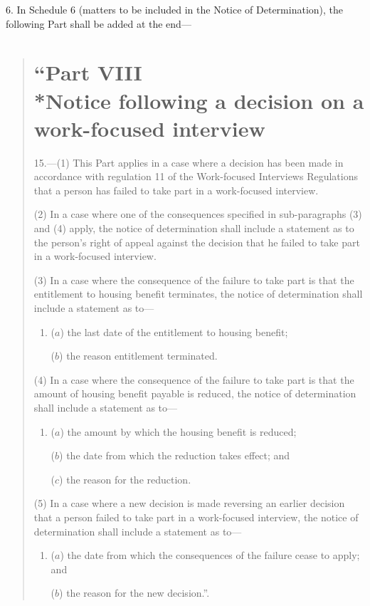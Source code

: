 \documentclass[12pt,a4paper]{article}
\begin{document}
6.  In Schedule 6 (matters to be included in the Notice of Determination), the following Part shall be added at the end—
\begin{quotation}
\section*{\sloppy “Part VIII\\*Notice following a decision on a work-focused interview}

15.---(1)  This Part applies in a case where a decision has been made in accordance with regulation 11 of the Work-focused Interviews Regulations that a person has failed to take part in a work-focused interview.

(2) In a case where one of the consequences specified in sub-paragraphs (3) and (4) apply, the notice of determination shall include a statement as to the person’s right of appeal against the decision that he failed to take part in a work-focused interview.

(3) In a case where the consequence of the failure to take part is that the entitlement to housing benefit terminates, the notice of determination shall include a statement as to—
\begin{enumerate}\item[]
($a$) the last date of the entitlement to housing benefit;

($b$) the reason entitlement terminated.
\end{enumerate}

(4) In a case where the consequence of the failure to take part is that the amount of housing benefit payable is reduced, the notice of determination shall include a statement as to—
\begin{enumerate}\item[]
($a$) the amount by which the housing benefit is reduced;

($b$) the date from which the reduction takes effect; and

($c$) the reason for the reduction.
\end{enumerate}

(5) In a case where a new decision is made reversing an earlier decision that a person failed to take part in a work-focused interview, the notice of determination shall include a statement as to—
\begin{enumerate}\item[]
($a$) the date from which the consequences of the failure cease to apply; and

($b$) the reason for the new decision.”.
\end{enumerate}
\end{quotation}
\end{document}
